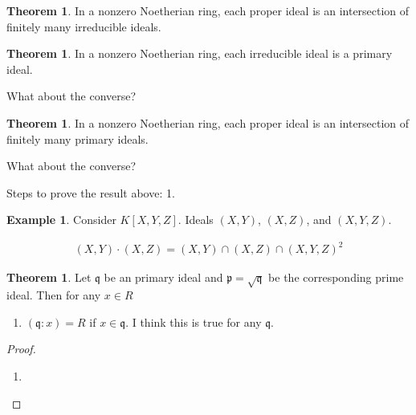 \documentclass[a4paper]{book}
\theoremstyle{definition}
\newtheorem{example}{Example}[definition]
\newtheorem{theorem}[definition]{Theorem}
\begin{document}
\begin{thmbox}
    \begin{theorem}
        In a nonzero Noetherian ring, each proper ideal is an intersection of finitely many irreducible ideals.
    \end{theorem}
\end{thmbox}

\begin{thmbox}
    \begin{theorem}
        In a nonzero Noetherian ring, each irreducible ideal is a primary ideal.
    \end{theorem}
\end{thmbox}
What about the converse?


\begin{thmbox}
    \begin{theorem}
        In a nonzero Noetherian ring, each proper ideal is an intersection of finitely many primary ideals.
    \end{theorem}
\end{thmbox}
What about the converse?

Steps to prove the result above:
1. 


\begin{example}
    Consider \(K[X, Y, Z]\). Ideals \((X, Y)\), \((X, Z)\), and \((X, Y, Z)\).

    \begin{align}
        (X, Y) \cdot (X, Z) = (X, Y) \cap (X, Z) \cap (X, Y, Z)^2
    \end{align}
\end{example}


\begin{thmbox}
    \begin{theorem}
        Let \(\mathfrak{q}\) be an primary ideal and \(\mathfrak{p} = \sqrt{\mathfrak{q}}\) be the corresponding prime ideal. Then for any \(x \in R\)
        \begin{enumerate}
            \item \((\mathfrak{q} : x) = R\) if \(x \in \mathfrak{q}\). I think this is true for any \(\mathfrak{q}\).
        \end{enumerate}
    \end{theorem}
\end{thmbox}
\begin{proof}
    \begin{enumerate}
        \item 
    \end{enumerate}
\end{proof}
\end{document}
